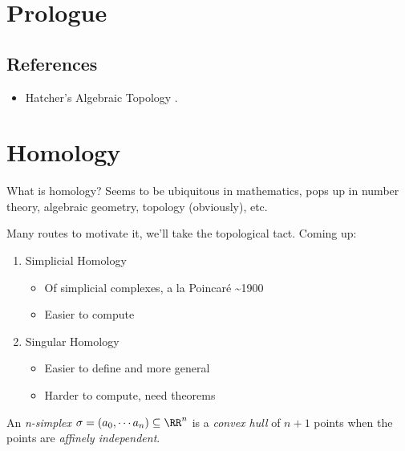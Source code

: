 \newpage
\tableofcontents

\hypertarget{prologue}{%
\section{Prologue}\label{prologue}}

\hypertarget{references}{%
\subsection{References}\label{references}}

\begin{itemize}
\tightlist
\item
  Hatcher's Algebraic Topology \autocite{hatcher_2019}.
\end{itemize}

\hypertarget{homology}{%
\section{Homology}\label{homology}}

What is homology? Seems to be ubiquitous in mathematics, pops up in
number theory, algebraic geometry, topology (obviously), etc.

Many routes to motivate it, we'll take the topological tact. Coming up:

\begin{enumerate}
\def\labelenumi{\arabic{enumi}.}
\item
  Simplicial Homology

  \begin{itemize}
  \tightlist
  \item
    Of simplicial complexes, a la Poincaré \textasciitilde1900
  \item
    Easier to compute
  \end{itemize}
\item
  Singular Homology

  \begin{itemize}
  \tightlist
  \item
    Easier to define and more general
  \item
    Harder to compute, need theorems
  \end{itemize}
\end{enumerate}

\begin{definition}

An \emph{n-simplex} \(\sigma = (a_0, \cdots a_n) \subseteq \RR^n\) is a
\emph{convex hull} of \(n+1\) points when the points are \emph{affinely
independent}.

\end{definition}

